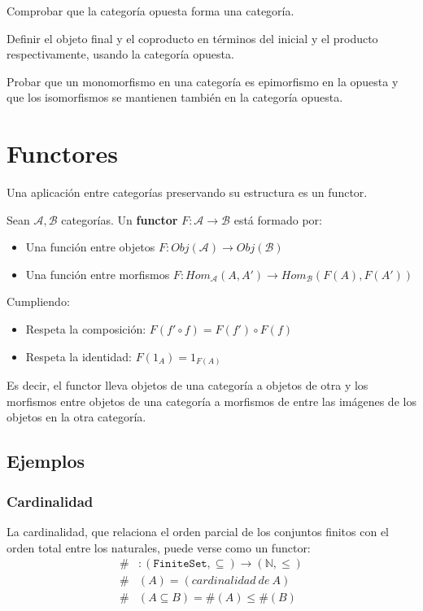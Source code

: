 \documentclass[11pt, fleqn, spanish]{book}
\begin{document}
\begin{exercise} 
  Comprobar que la categoría opuesta forma una categoría.
\end{exercise}
\begin{exercise} 
  Definir el objeto final y el coproducto en términos del inicial y
  el producto respectivamente, usando la categoría opuesta.
\end{exercise}
\begin{exercise} 
  Probar que un monomorfismo en una categoría es epimorfismo en la
  opuesta y que los isomorfismos se mantienen también en la categoría
  opuesta.
\end{exercise}

 
\section {Functores}
Una aplicación entre categorías preservando su estructura es un functor.

\begin{definition} Sean $\mathcal{A}, \mathcal{B}$ categorías. Un \textbf{functor} 
  $F: \mathcal{A} \rightarrow \mathcal{B}$ está formado por:
  \begin{itemize}
  \item Una función entre objetos $F: Obj(\mathcal{A}) \rightarrow Obj(\mathcal{B})$
  \item Una función entre morfismos $F: Hom_\mathcal{A}(A,A') \rightarrow Hom_\mathcal{B}(F(A),F(A'))$
  \end{itemize}
  Cumpliendo:
  \begin{itemize}
  \item Respeta la composición: $F(f' \circ f) = F(f') \circ F(f)$
  \item Respeta la identidad: $F(1_A) = 1_{F(A)}$
  \end{itemize}
\end{definition}

Es decir, el functor lleva objetos de una categoría a objetos de otra y los morfismos
entre objetos de una categoría a morfismos de entre las imágenes de los objetos en la
otra categoría.

\subsection {Ejemplos}
\subsubsection{Cardinalidad}
La cardinalidad, que relaciona el orden parcial de los conjuntos finitos con el
orden total entre los naturales, puede verse como un functor:
\begin{align*}
  \#&: \mathtt{(FiniteSet,\subseteq)} \rightarrow \mathtt{(\mathbb{N},\leq)} \\
  \#&(A) = (cardinalidad\ de\ A) \\
  \#&(A \subseteq B) = \#(A) \leq \#(B) 
\end{align*}
\end{document}
